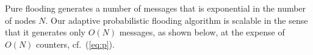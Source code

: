 \documentclass[conference]{IEEEtran}
\newcommand{\N}{N}
\newcommand{\FW}{\text{ADV}}
\begin{document}
\begin{comment}
The most simple technique is \emph{pure flooding}\cite{Matei02Ic}. The semantic is such that every time an intermediate node receives \FW\ frame, it sends a copy on every output link it owns. The need of a termination parameter arises, and it is connected to the length (in term of links) of the discovered path. So, if a message has traversed more than \ML\ links it gets discarded. We may retrieve an analytical expression on the number of messages produced by this technique:
\begin{eqnarray}
\nm	& \leq  & 	\degr\,\frac{1-(\degr-1)^{\ML(\N)}}{1-(\degr-1)}
\label{eqn:boundfl}
\end{eqnarray}
From eq. \eqref{eqn:boundfl}, we can note as number of messages increases exponentially in function of \ML, making the algorithm really sensible to parameter variation; moreover, \ML\ is strictly connected to \N: as \N\ increases paths are to be longer, so scalability of the algorithm is not preserved. With such technique nodes have to store no variables in order to run the algorithm: needed state is null.

Fixed flooding an intermediate node that receives \FW\ frame sends a copy on every link, extracting a probability \PB, said \emph{probability of flooding}. Retention parameter \ML\ is still necessary. In fact, setting \PB, every node just floods less the network, which would be anyway saturated by a storm of messages if \ML\ was set to $\infty$. In order to give a proof of that, we can extract again an analytical bound to \nm:
\begin{eqnarray}
\nm	&\leq&	\degr\,\frac{1-[(\degr-1)\PB]^{\ML(\N)}}{1-(\degr-1)\PB}
\label{eqn:upperpr}
\end{eqnarray}
As we can state from eq. \eqref{eqn:upperpr}, when \ML\ tends to $\infty$ the same does number of messages. In this sense, we have again an exponential \nm\ growth (function of \ML) with two parameters to consider. That brings to a more complex protocol, not scalable and difficult to calibrate. Also in that case, stored state within every node is null, as no variable has to be maintained inside routers.


\end{comment}


Pure flooding generates a number of messages that is exponential in the number of nodes $N$. 
 Our adaptive probabilistic flooding algorithm is scalable in the sense that it generates  only $O(\N)$ messages, as shown below, at the expense of  $O(\N)$ counters, cf.~(\ref{eq:p}).
\end{document}
